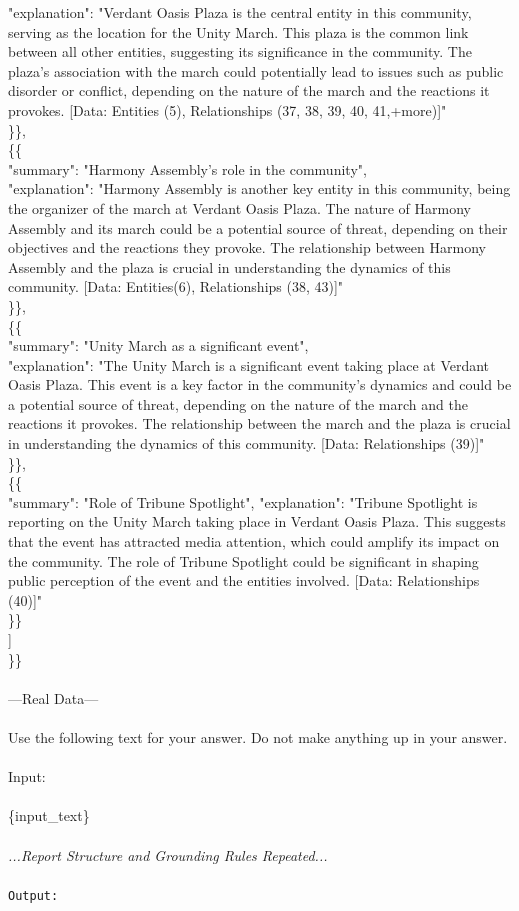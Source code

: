 \documentclass{article}
\begin{document}
{            "explanation": "Verdant Oasis Plaza is the central entity in this community, serving as the location for the Unity March. This plaza is the common link between all other entities, suggesting its significance in the community. The plaza's association with the march could potentially lead to issues such as public disorder or conflict, depending on the nature of the march and the reactions it provokes. [Data: Entities (5), Relationships (37, 38, 39, 40, 41,+more)]"\\
        \}\},\\
        \{\{\\
            "summary": "Harmony Assembly's role in the community",\\
            "explanation": "Harmony Assembly is another key entity in this community, being the organizer of the march at Verdant Oasis Plaza. The nature of Harmony Assembly and its march could be a potential source of threat, depending on their objectives and the reactions they provoke. The relationship between Harmony Assembly and the plaza is crucial in understanding the dynamics of this community. [Data: Entities(6), Relationships (38, 43)]"\\
        \}\},\\
        \{\{\\
            "summary": "Unity March as a significant event",\\
            "explanation": "The Unity March is a significant event taking place at Verdant Oasis Plaza. This event is a key factor in the community's dynamics and could be a potential source of threat, depending on the nature of the march and the reactions it provokes. The relationship between the march and the plaza is crucial in understanding the dynamics of this community. [Data: Relationships (39)]"\\
        \}\},\\
        \{\{\\
            "summary": "Role of Tribune Spotlight",
            "explanation": "Tribune Spotlight is reporting on the Unity March taking place in Verdant Oasis Plaza. This suggests that the event has attracted media attention, which could amplify its impact on the community. The role of Tribune Spotlight could be significant in shaping public perception of the event and the entities involved. [Data: Relationships (40)]"\\
        \}\}\\
    ]\\
\}\}\\
\\
---Real Data---\\
\\
Use the following text for your answer. Do not make anything up in your answer.\\
\\
Input:\\
\\
\{input\_text\}\\}
\textit{\\
...Report Structure and Grounding Rules Repeated...\\
\\}
\texttt{Output:}
\end{document}
